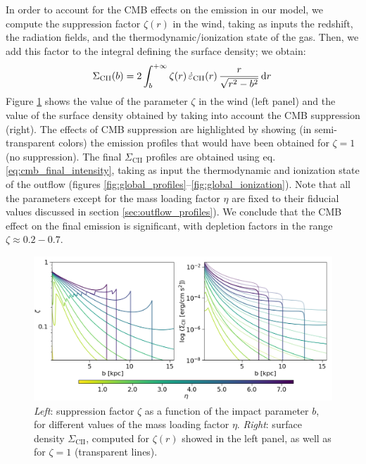 In order to account for the CMB effects on the \CII emission in our model, we compute the suppression factor $\zeta(r)$ in the wind, taking as inputs the redshift, the radiation fields, and the thermodynamic/ionization state of the gas. Then, we add this factor to the integral defining the \CII surface density; we obtain:
\begin{align}
\Sigma_\mathrm{CII}(b)=2 \int_{b}^{+\infty}\zeta(r) \,\dot{\varepsilon}_\mathrm{CII}(r)\, \frac{r}{\sqrt{r^2 - b^2}}\,\mathrm{d} r \,
\label{eq:cmb_final_intensity}
\end{align}
Figure \ref{fig:global_emission_cmb} shows the value of the parameter $\zeta$ in the wind (left panel) and the value of the \CII surface density obtained by taking into account the CMB suppression (right). The effects of CMB suppression are highlighted by showing (in semi-transparent colors) the emission profiles that would have been obtained for $\zeta =1$ (no suppression). The final $\Sigma_\mathrm{CII}$ profiles are obtained using eq. \ref{eq:cmb_final_intensity}, taking as input the thermodynamic and ionization state of the outflow (figures \ref{fig:global_profiles}--\ref{fig:global_ionization}). Note that all the parameters except for the mass loading factor $\eta$ are fixed to their fiducial values discussed in section \ref{sec:outflow_profiles}). We conclude that the CMB effect on the final \CII emission is significant, with depletion factors in the range $\zeta \approx0.2-0.7$.



\begin{figure}
    \centering
    \includegraphics[width=1.0\textwidth]{plots/cmb_emission.png}
    \caption{\textit{Left}: suppression factor $\zeta$ as a function of the impact parameter $b$, for different values of the mass loading factor $\eta$. \textit{Right}: \CII surface density $\Sigma_\mathrm{CII}$, computed for $\zeta(r)$ showed in the left panel, as well as for $\zeta =1$ (transparent lines).
    \label{fig:global_emission_cmb}
    }
\end{figure}





